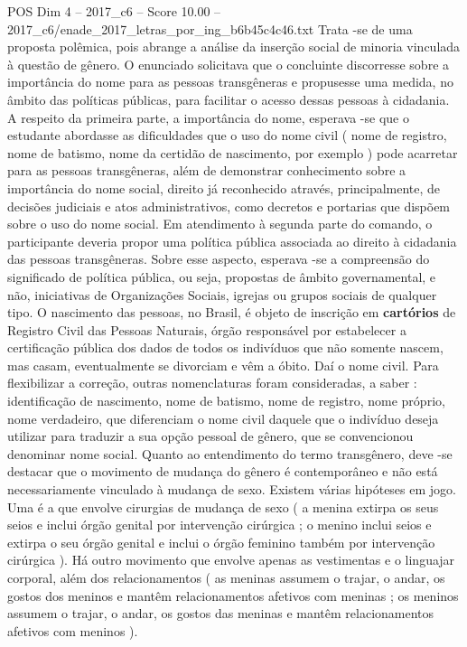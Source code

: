 \begin{textsample}{POS Dim 4 – 2017\_c6 – Score 10.00 – 2017\_c6/enade\_2017\_letras\_por\_ing\_b6b45c4c46.txt}
Trata -se de uma proposta polêmica, pois abrange a análise da inserção social de minoria vinculada à questão de gênero.
O enunciado solicitava que o concluinte discorresse sobre a importância do nome para as pessoas transgêneras e propusesse uma medida, no âmbito das políticas públicas, para facilitar o acesso dessas pessoas à cidadania.
A respeito da primeira parte, a importância do nome, esperava -se que o estudante abordasse as dificuldades que o uso do nome civil ( nome de registro, nome de batismo, nome da certidão de nascimento, por exemplo ) pode acarretar para as pessoas transgêneras, além de demonstrar conhecimento sobre a importância do nome social, direito já reconhecido através, principalmente, de decisões judiciais e atos administrativos, como decretos e portarias que dispõem sobre o uso do nome social.
Em atendimento à segunda parte do comando, o participante deveria propor uma política pública associada ao direito à cidadania das pessoas transgêneras.
Sobre esse aspecto, esperava -se a compreensão do significado de política pública, ou seja, propostas de âmbito governamental, e não, iniciativas de Organizações Sociais, igrejas ou grupos sociais de qualquer tipo.
O nascimento das pessoas, no Brasil, é objeto de inscrição em \textbf{cartórios} de Registro Civil das Pessoas Naturais, órgão responsável por estabelecer a certificação pública dos dados de todos os indivíduos que não somente nascem, mas casam, eventualmente se divorciam e vêm a óbito.
Daí o nome civil.
Para flexibilizar a correção, outras nomenclaturas foram consideradas, a saber : identificação de nascimento, nome de batismo, nome de registro, nome próprio, nome verdadeiro, que diferenciam o nome civil daquele que o indivíduo deseja utilizar para traduzir a sua opção pessoal de gênero, que se convencionou denominar nome social.
Quanto ao entendimento do termo transgênero, deve -se destacar que o movimento de mudança do gênero é contemporâneo e não está necessariamente vinculado à mudança de sexo.
Existem várias hipóteses em jogo.
Uma é a que envolve cirurgias de mudança de sexo ( a menina extirpa os seus seios e inclui órgão genital por intervenção cirúrgica ; o menino inclui seios e extirpa o seu órgão genital e inclui o órgão feminino também por intervenção cirúrgica ).
Há outro movimento que envolve apenas as vestimentas e o linguajar corporal, além dos relacionamentos ( as meninas assumem o trajar, o andar, os gostos dos meninos e mantêm relacionamentos afetivos com meninas ; os meninos assumem o trajar, o andar, os gostos das meninas e mantêm relacionamentos afetivos com meninos ).

\end{textsample}
